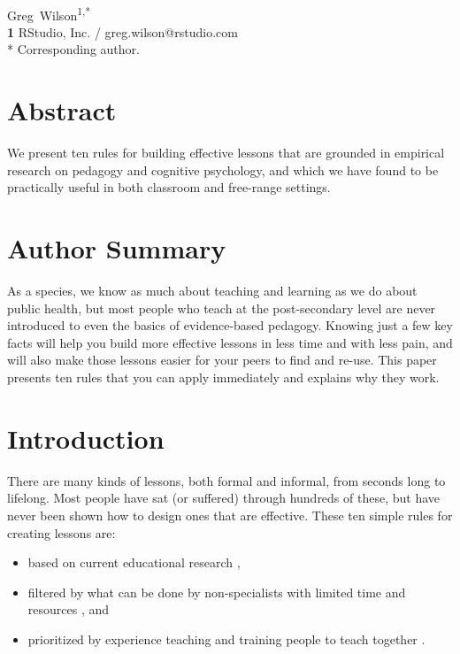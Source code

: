 \documentclass[10pt,letterpaper]{article}
\begin{document}
\vspace*{0.2in}

\begin{flushleft}
{\Large
\textbf{}
}
\newline
\\
{Greg~Wilson}\textsuperscript{1,*}
\\
\textbf{1} RStudio, Inc. / greg.wilson@rstudio.com
\\
\bigskip
* Corresponding author.
\end{flushleft}

\section*{Abstract}

We present ten rules for building effective lessons that are grounded in
empirical research on pedagogy and cognitive psychology, and which we have found
to be practically useful in both classroom and free-range settings.

\section*{Author Summary}

As a species, we know as much about teaching and learning as we do about public
health, but most people who teach at the post-secondary level are never
introduced to even the basics of evidence-based pedagogy.  Knowing just a few
key facts will help you build more effective lessons in less time and with less
pain, and will also make those lessons easier for your peers to find and re-use.
This paper presents ten rules that you can apply immediately and explains why
they work.

\section*{Introduction}

There are many kinds of lessons, both formal and informal, from seconds long to
lifelong.  Most people have sat (or suffered) through hundreds of these, but
have never been shown how to design ones that are effective.  These ten simple
rules for creating lessons are:

\begin{itemize}

\item based on current educational research \cite{Nuth2007,Ambr2010,DeBr2015,Dida2016,Brow2018,Mark2018},

\item filtered by what can be done by non-specialists with limited time and
  resources \cite{Hust2012,Lang2016}, and

\item prioritized by experience teaching and training people to teach together
  \cite{Deve2018,Wils2016,Wils2018}.

\end{itemize}
\end{document}
